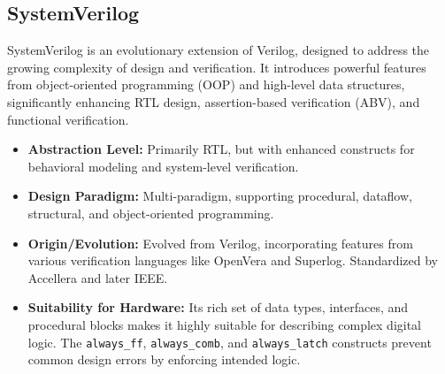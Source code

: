 \documentclass[sigconf, anonymous=false]{acmart} %
\begin{document}
\subsection{SystemVerilog}
SystemVerilog\cite{10458102} is an evolutionary extension of Verilog, designed to address the growing complexity of design and verification. It introduces powerful features from object-oriented programming (OOP) and high-level data structures, significantly enhancing RTL design, assertion-based verification (ABV), and functional verification.
\begin{itemize}
    \item \textbf{Abstraction Level:} Primarily RTL, but with enhanced constructs for behavioral modeling and system-level verification.
    \item \textbf{Design Paradigm:} Multi-paradigm, supporting procedural, dataflow, structural, and object-oriented programming.
    \item \textbf{Origin/Evolution:} Evolved from Verilog, incorporating features from various verification languages like OpenVera and Superlog. Standardized by Accellera and later IEEE.
    \item \textbf{Suitability for Hardware:} Its rich set of data types, interfaces, and procedural blocks makes it highly suitable for describing complex digital logic. The \texttt{always\_ff}, \texttt{always\_comb}, and \texttt{always\_latch} constructs prevent common design errors by enforcing intended logic.

    
\end{itemize}
\end{document}
